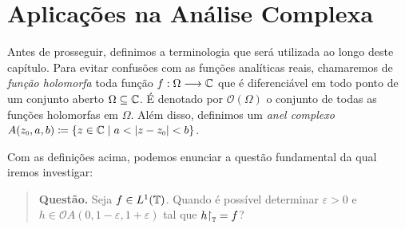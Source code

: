 \documentclass[../main.tex]{subfiles}
\begin{document}
\chapter{Aplicações na Análise Complexa}
Antes de prosseguir, definimos a terminologia que será utilizada ao longo deste capítulo. Para evitar confusões com as funções analíticas reais, chamaremos de \textit{função holomorfa} toda função $f: \Omega\longrightarrow \operatorname{\mathbb{C}}$ que é diferenciável em todo ponto de um conjunto aberto $\Omega\subseteq \operatorname{\mathbb{C}}$. É denotado por $\mathscr O(\Omega)$ o conjunto de todas as funções holomorfas em $\Omega$. Além disso, definimos um \textit{anel complexo} $A(\sub z0, a,b) \coloneqq \{z\in \C \mid a < |z-\sub z0| < b\}$.

Com as definições acima, podemos enunciar a questão fundamental da qual iremos investigar:
\begin{quote}
    \textbf{Questão.} Seja $f\in L^1(\mathbb T)$. Quando é possível determinar $\varepsilon>0$ e $h\in \mathscr OA(0, 1-\varepsilon, 1+\varepsilon)$ tal que $h \sub\restrita{\UnitalCircle} = f$?
\end{quote}
\end{document}
